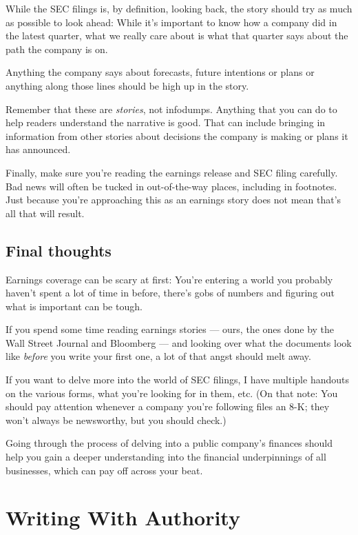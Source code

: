 \documentclass[
  12pt,
  american,
  letterpaperpaper,
  extrafontsizes,onecolumn,openright
  ]{memoir}
\begin{document}
While the SEC filings is, by definition, looking back, the story should try as much as possible to look ahead: While it's important to know how a company did in the latest quarter, what we really care about is what that quarter says about the path the company is on.

Anything the company says about forecasts, future intentions or plans or anything along those lines should be high up in the story.

Remember that these are \emph{stories}, not infodumps. Anything that you can do to help readers understand the narrative is good. That can include bringing in information from other stories about decisions the company is making or plans it has announced.

Finally, make sure you're reading the earnings release and SEC filing carefully. Bad news will often be tucked in out-of-the-way places, including in footnotes. Just because you're approaching this as an earnings story does not mean that's all that will result.

\hypertarget{final-thoughts-3}{%
\section*{Final thoughts}\label{final-thoughts-3}}

Earnings coverage can be scary at first: You're entering a world you probably haven't spent a lot of time in before, there's gobs of numbers and figuring out what is important can be tough.

If you spend some time reading earnings stories --- ours, the ones done by the Wall Street Journal and Bloomberg --- and looking over what the documents look like \emph{before} you write your first one, a lot of that angst should melt away.

If you want to delve more into the world of SEC filings, I have multiple handouts on the various forms, what you're looking for in them, etc. (On that note: You should pay attention whenever a company you're following files an 8-K; they won't always be newsworthy, but you should check.)

Going through the process of delving into a public company's finances should help you gain a deeper understanding into the financial underpinnings of all businesses, which can pay off across your beat.

\hypertarget{writing-with-authority}{%
\chapter{Writing With Authority}\label{writing-with-authority}}
\end{document}
